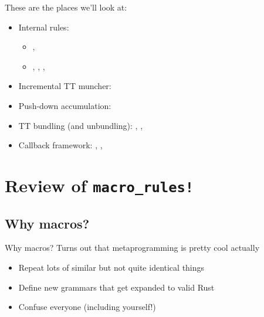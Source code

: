 \documentclass{beamer}
\begin{document}
	\begin{frame}
		These are the places we'll look at:

		\small
		\begin{itemize}
			\item Internal rules:
			\begin{itemize}
				\item {}, 
				\item {}, , ,
			\end{itemize}
			\pause
			\item Incremental TT muncher: 
			\pause
			\item Push-down accumulation: 
			\pause
			\item TT bundling (and unbundling): ,
			,
			\pause
			\item Callback framework: ,
			,
		\end{itemize}
	\end{frame}

	\section[Review of macro\_rules!]{Review of {\color{macrorulescolor}\texttt{macro\_rules!}}}
	\subsection{Why macros?}
	\begin{frame}{Why macros?}
		Turns out that metaprogramming is pretty cool actually \\

		\begin{itemize}
			\item Repeat lots of similar but not quite identical things
			\pause
			\item Define new grammars that get expanded to valid Rust
			\pause
			\item Confuse everyone (including yourself!)
		\end{itemize}
	\end{frame}
\end{document}
